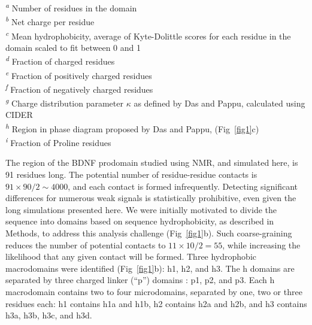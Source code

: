 \documentclass[10pt,letterpaper]{article}
\begin{document}
\begin{table}[!ht]
\begin{adjustwidth}{-2.25in}{0in}
\begin{flushleft}
\textsuperscript{\emph{a}} Number of residues in the domain\\
\textsuperscript{\emph{b}} Net charge per residue\\
\textsuperscript{\emph{c}} Mean hydrophobicity, average of Kyte-Dolittle\cite{Kyte1982a} scores for each residue in the domain scaled to fit between 0 and 1  \\
\textsuperscript{\emph{d}} Fraction of charged residues\\
\textsuperscript{\emph{e}} Fraction of positively charged residues\\
\textsuperscript{\emph{f}} Fraction of negatively charged residues\\ 
\textsuperscript{\emph{g}} Charge distribution parameter $\kappa$ as defined by Das and Pappu\cite{Das2013a}, calculated using CIDER~\cite{Holehouse2017} \\
\textsuperscript{\emph{h}} Region in phase diagram proposed by Das and Pappu\cite{Das2013a}, (Fig~\ref{fig1}c)\\
\textsuperscript{\emph{i}} Fraction of Proline residues\\
\end{flushleft}
\end{adjustwidth}
\end{table}

The region of the BDNF prodomain studied using NMR\cite{Anastasia2013}, and simulated here, is 91 residues long. The potential number of residue-residue contacts is $91\times90/2\sim4000$, and each contact is formed infrequently. Detecting significant differences for numerous weak signals is statistically prohibitive, even given the long simulations presented here. We were initially motivated to divide the sequence into domains based on sequence hydrophobicity, as described in Methods, to address this analysis challenge (Fig~\ref{fig1}b). Such coarse-graining reduces the number of potential contacts to $11\times10/2=55$, while increasing the likelihood that any given contact will be formed. Three hydrophobic macrodomains were identified (Fig~\ref{fig1}b): h1, h2, and h3. The h domains are separated by three charged linker (``p'') domains : p1, p2, and p3. Each h macrodomain contains two to four microdomains, separated by one, two or three residues each: h1 contains h1a and h1b, h2 contains h2a and h2b, and h3 contains h3a, h3b, h3c, and h3d.  
\end{document}
